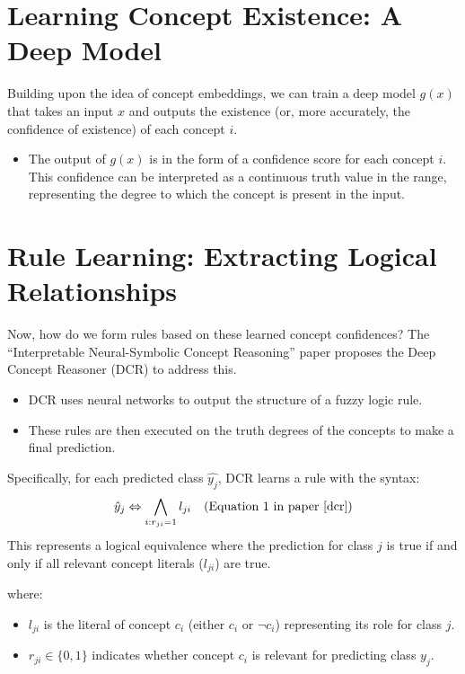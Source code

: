 \documentclass[10pt, oneside]{article}
\begin{document}
\section{Learning Concept Existence: A Deep Model}
Building upon the idea of concept embeddings, we can train a deep model $g(x)$ that takes an input $x$ and outputs the existence (or, more accurately, the confidence of existence) of each concept $i$.

\begin{itemize}
   \item The output of $g(x)$ is in the form of a confidence score for each concept $i$. This confidence can be interpreted as a continuous truth value in the range, representing the degree to which the concept is present in the input.
\end{itemize}

\section{Rule Learning: Extracting Logical Relationships}
Now, how do we form rules based on these learned concept confidences? The ``Interpretable Neural-Symbolic Concept Reasoning'' paper \cite{dcr} proposes the Deep Concept Reasoner (DCR) to address this.

\begin{itemize}
   \item DCR uses neural networks to output the structure of a fuzzy logic rule.
   \item These rules are then executed on the truth degrees of the concepts to make a final prediction.
\end{itemize}

Specifically, for each predicted class $\widehat{y_j}$, DCR learns a rule with the syntax:
\begin{equation}
   \hat{y}_j \Leftrightarrow \bigwedge_{i: r_{ji}=1} l_{ji} \quad \text{(Equation 1 in paper \cite{dcr})}
\end{equation}
This represents a logical equivalence where the prediction for class $j$ is true if and only if all relevant concept literals ($l_{ji}$) are true. 

where:
\begin{itemize}
   \item $l_{ji}$ is the literal of concept $c_i$ (either $c_i$ or $\lnot c_i$) representing its role for class $j$.
   \item $r_{ji} \in \{0,1\}$ indicates whether concept $c_i$ is relevant for predicting class $y_j$.
\end{itemize}
\end{document}
